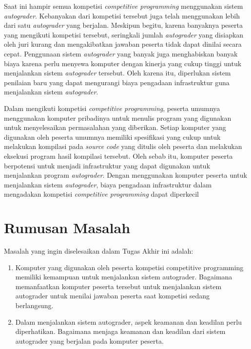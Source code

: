 \par Saat ini hampir semua kompetisi \textit{competitive programming} menggunakan sistem \textit{autograder}. Kebanyakan dari kompetisi tersebut juga telah menggunakan lebih dari satu \textit{autograder} yang berjalan. Meskipun begitu, karena banyaknya peserta yang mengikuti kompetisi tersebut, seringkali jumlah \textit{autograder} yang disiapkan oleh juri kurang dan mengakibatkan jawaban peserta tidak dapat dinilai secara cepat. Penggunaan sistem \textit{autograder} yang banyak juga menghabiskan banyak biaya karena perlu menyewa komputer dengan kinerja yang cukup tinggi untuk menjalankan sistem \textit{autograder} tersebut. Oleh karena itu, diperlukan sistem penilaian baru yang dapat mengurangi biaya pengadaan infrastruktur guna menjalankan sistem \textit{autograder}.

\par Dalam mengikuti kompetisi \textit{competitive programming}, peserta umumnya menggunakan komputer pribadinya untuk menulis program yang digunakan untuk menyelesaikan permasalahan yang diberikan. Setiap komputer yang digunakan oleh peserta umumnya memiliki spesifikasi yang cukup untuk melakukan kompilasi pada \textit{source code} yang ditulis oleh peserta dan melakukan eksekusi program hasil kompilasi tersebut. Oleh sebab itu, komputer peserta berpotensi untuk menjadi infrastruktur yang dapat digunakan untuk menjalankan program \textit{autograder}. Dengan menggunakan komputer peserta untuk menjalankan sistem \textit{autograder}, biaya pengadaan infrastruktur dalam mengadakan kompetisi \textit{competitive programming} dapat diperkecil

\section{Rumusan Masalah}

\par Masalah yang ingin diselesaikan dalam Tugas Akhir ini adalah:
\begin{enumerate}
	\item Komputer yang digunakan oleh peserta kompetisi competitive programming memiliki kemampuan untuk menjalankan sistem autograder. Bagaimana memanfaatkan komputer peserta tersebut untuk menjalankan sistem autograder untuk menilai jawaban peserta saat kompetisi sedang berlangsung.
	\item Dalam menjalankan sistem autograder, aspek keamanan dan keadilan perlu diperhatikan. Bagaimana menjaga keamanan dan keadilan dari sistem autograder yang berjalan pada komputer peserta.
\end{enumerate}


